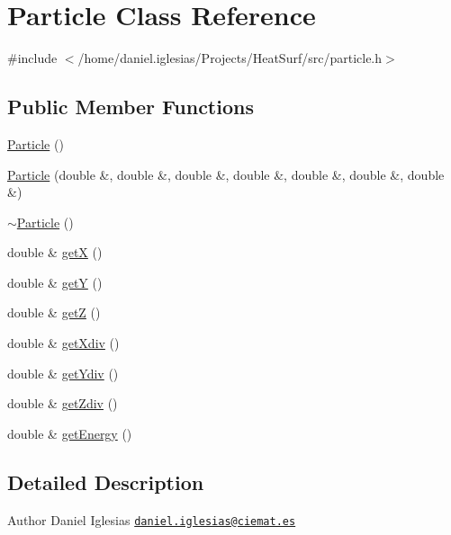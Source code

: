 \hypertarget{classParticle}{\section{Particle Class Reference}
\label{classParticle}
}


{\ttfamily \#include $<$/home/daniel.\-iglesias/\-Projects/\-Heat\-Surf/src/particle.\-h$>$}

\subsection*{Public Member Functions}
\begin{DoxyCompactItemize}
\item 
\hyperlink{classParticle_a40f4c7e248029d72e7714b7802d5e5e1}{Particle} ()
\item 
\hyperlink{classParticle_afe58ede734a89206a2f38ef291f79fbf}{Particle} (double \&, double \&, double \&, double \&, double \&, double \&, double \&)
\item 
\hyperlink{classParticle_ad030d0fe7b88cf81744b127c99244ff4}{$\sim$\-Particle} ()
\item 
double \& \hyperlink{classParticle_abf0b2c3e900576254d9e76255dfaf81d}{get\-X} ()
\item 
double \& \hyperlink{classParticle_a0fc4232c919f5b1946c2fa74f7a3a9ed}{get\-Y} ()
\item 
double \& \hyperlink{classParticle_a1b287734891b40546e06e17db8589fca}{get\-Z} ()
\item 
double \& \hyperlink{classParticle_a0813b73b2d08f57f05607df530684e14}{get\-Xdiv} ()
\item 
double \& \hyperlink{classParticle_a1898356f0c9ecb8dc5bae09a8dc0e326}{get\-Ydiv} ()
\item 
double \& \hyperlink{classParticle_a9435d915d86f9df46203f9b5c72888d0}{get\-Zdiv} ()
\item 
double \& \hyperlink{classParticle_ad8d1a1de9b549f2a532a8d9a9f97c8fb}{get\-Energy} ()
\end{DoxyCompactItemize}


\subsection{Detailed Description}
\begin{DoxyAuthor}{Author}
Daniel Iglesias \href{mailto:daniel.iglesias@ciemat.es}{\tt daniel.\-iglesias@ciemat.\-es} 
\end{DoxyAuthor}


